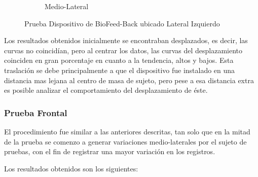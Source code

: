 \documentclass[12pt,a4paper]{article}
\newcommand{\nombreDispositivo}{Dispositivo de BioFeed-Back }
\begin{document}
\begin{figure}[H]
\begin{subfigure}{.5\textwidth}
			\caption{Medio-Lateral}
			\label{fig:medioLateralIzquierdo}
		\end{subfigure}
		\caption{Prueba \nombreDispositivo ubicado Lateral Izquierdo}
		\label{fig:pruebaLateralIzquierdo}
	\end{figure}
	
	Los resultados obtenidos inicialmente se encontraban desplazados, es decir, las curvas no coincidían, pero al centrar los datos, las curvas del desplazamiento coinciden en gran porcentaje en cuanto a la tendencia, altos y bajos.
	Esta traslación se debe principalmente a que el dispositivo fue instalado en una distancia mas lejana al centro de masa de sujeto, pero pese a esa distancia extra es posible analizar el comportamiento del desplazamiento de éste.
	
\newpage
\subsubsection{Prueba Frontal}
El procedimiento fue similar a las anteriores descritas, tan solo que en la mitad de la prueba se comenzo a generar variaciones medio-laterales por el sujeto de pruebas, con el fin de registrar una mayor variación en los registros.

Los resultados obtenidos son los siguientes:
	
\end{document}
